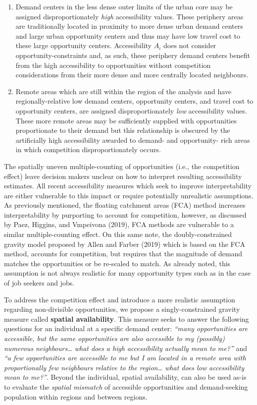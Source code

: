 \documentclass[]{elsarticle} %
\begin{document}
\begin{enumerate}
\def\labelenumi{\arabic{enumi})}
\item
  Demand centers in the less dense outer limits of the urban core may be
  assigned disproportionately \emph{high} accessibility values. These
  periphery areas are traditionally located in proximity to more dense
  urban demand centers and large urban opportunity centers and thus may
  have low travel cost to these large opportunity centers. Accessibility
  \(A_i\) does not consider opportunity-constraints and, as such, these
  periphery demand centers benefit from the high accessibility to
  opportunities without competition considerations from their more dense
  and more centrally located neighbours.
\item
  Remote areas which are still within the region of the analysis and
  have regionally-relative low demand centers, opportunity centers, and
  travel cost to opportunity centers, are assigned disproportionately
  \emph{low} accessibility values. These more remote areas may be
  sufficiently supplied with opportunities proportionate to their demand
  but this relationship is obscured by the artificially high
  accessibility awarded to demand- and opportunity- rich areas in which
  competition disproportionately occurs.
\end{enumerate}

The spatially uneven multiple-counting of opportunities (i.e., the
competition effect) leave decision makers unclear on how to interpret
resulting accessibility estimates. All recent accessibility measures
which seek to improve interpretability are either vulnerable to this
impact or require potentially unrealistic assumptions. As previously
mentioned, the floating catchment areas (FCA) method increases
interpretability by purporting to account for competition, however, as
discussed by Paez, Higgins, and Vmpeivona (2019), FCA methods are
vulnerable to a similar multiple-counting effect. On this same note, the
doubly-constrained gravity model proposed by Allen and Farber (2019)
which is based on the FCA method, accounts for competition, but requires
that the magnitude of demand matches the opportunities or be re-scaled
to match. As already noted, this assumption is not always realistic for
many opportunity types such as in the case of job seekers and jobs.

To address the competition effect and introduce a more realistic
assumption regarding non-divisible opportunities, we propose a
singly-constrained gravity measure called \textbf{spatial availability}.
This measure seeks to answer the following questions for an individual
at a specific demand center: \emph{``many opportunities are accessible,
but the same opportunities are also accessible to my (possibly) numerous
neighbours\ldots{} what does a high accessibility actually mean to
me?''} and \emph{``a few opportunities are accessible to me but I am
located in a remote area with proportionally few neighbours relative to
the region\ldots{} what does low accessibility mean to me?''}. Beyond
the individual, spatial availability, can also be used as-is to evaluate
the \emph{spatial mismatch} of accessible opportunities and
demand-seeking population within regions and between regions.
\end{document}
